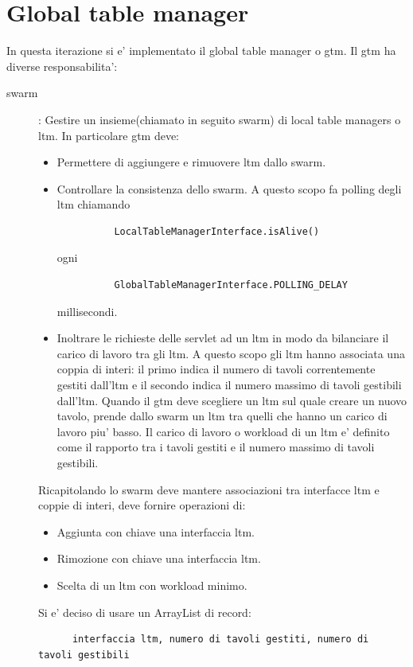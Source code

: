 \section{Global table manager}
    In questa iterazione si e' implementato il global table manager o gtm. Il gtm ha diverse responsabilita': 
    \begin{description}
      \item[swarm]: 
	Gestire un insieme(chiamato in seguito swarm) di local table managers o ltm. In particolare gtm deve:
	\begin{itemize}
	  \item 
	    Permettere di aggiungere e rimuovere ltm dallo swarm.
	  \item
	    Controllare la consistenza dello swarm. A questo scopo fa polling degli ltm chiamando 	
	    \begin{verbatim} 
	      LocalTableManagerInterface.isAlive()
	    \end{verbatim}
	    ogni 
	    \begin{verbatim} 
	      GlobalTableManagerInterface.POLLING_DELAY
	    \end{verbatim} 
	    millisecondi.   
	  \item
	    Inoltrare le richieste delle servlet ad un ltm in modo da bilanciare il carico di lavoro tra gli ltm. A questo scopo gli ltm hanno associata una coppia di interi: il primo indica il numero di tavoli correntemente gestiti dall'ltm e il secondo indica il numero massimo di tavoli gestibili dall'ltm. Quando il gtm deve scegliere un ltm sul quale creare un nuovo tavolo, prende dallo swarm un ltm tra quelli che hanno un carico di lavoro piu' basso. Il carico di lavoro o workload di un ltm e' definito come il rapporto tra i tavoli gestiti e il numero massimo di tavoli gestibili.
	\end{itemize}
	Ricapitolando lo swarm deve mantere associazioni tra interfacce ltm e coppie di interi, deve fornire operazioni di:
	\begin{itemize}
	   \item 	
	      Aggiunta con chiave una interfaccia ltm.
	   \item 
	      Rimozione con chiave una interfaccia ltm.
	   \item 	
	      Scelta di un ltm con workload minimo.
	\end{itemize}
	Si e' deciso di usare un ArrayList di record:
	\begin{verbatim}
	  interfaccia ltm, numero di tavoli gestiti, numero di tavoli gestibili

\end{verbatim}
\end{description}
